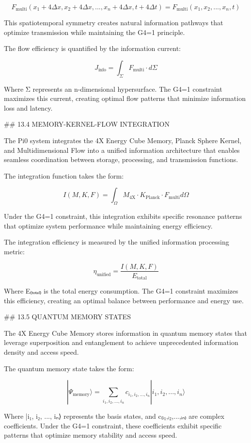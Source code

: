 $$F_{\text{multi}}(x_1+4\Delta x, x_2+4\Delta x, ..., x_n+4\Delta x, t+4\Delta t) = F_{\text{multi}}(x_1, x_2, ..., x_n, t)$$

This spatiotemporal symmetry creates natural information pathways that optimize transmission while maintaining the G4=1 principle.

The flow efficiency is quantified by the information current:

$$J_{\text{info}} = \int_{\Sigma} F_{\text{multi}} \cdot d\Sigma$$

Where Σ represents an n-dimensional hypersurface. The G4=1 constraint maximizes this current, creating optimal flow patterns that minimize information loss and latency.

## 13.4 MEMORY-KERNEL-FLOW INTEGRATION

The Pi0 system integrates the 4X Energy Cube Memory, Planck Sphere Kernel, and Multidimensional Flow into a unified information architecture that enables seamless coordination between storage, processing, and transmission functions.

The integration function takes the form:

$$I(M, K, F) = \int_{\Omega} M_{\text{4X}} \cdot K_{\text{Planck}} \cdot F_{\text{multi}} d\Omega$$

Under the G4=1 constraint, this integration exhibits specific resonance patterns that optimize system performance while maintaining energy efficiency.

The integration efficiency is measured by the unified information processing metric:

$$\eta_{\text{unified}} = \frac{I(M, K, F)}{E_{\text{total}}}$$

Where E₍ₜₒₜₐₗ₎ is the total energy consumption. The G4=1 constraint maximizes this efficiency, creating an optimal balance between performance and energy use.

## 13.5 QUANTUM MEMORY STATES

The 4X Energy Cube Memory stores information in quantum memory states that leverage superposition and entanglement to achieve unprecedented information density and access speed.

The quantum memory state takes the form:

$$|\Psi_{\text{memory}}\rangle = \sum_{i_1, i_2, ..., i_n} c_{i_1, i_2, ..., i_n} |i_1, i_2, ..., i_n\rangle$$

Where |i₁, i₂, ..., iₙ⟩ represents the basis states, and c₍ᵢ₁,ᵢ₂,...,ᵢₙ₎ are complex coefficients. Under the G4=1 constraint, these coefficients exhibit specific patterns that optimize memory stability and access speed.

